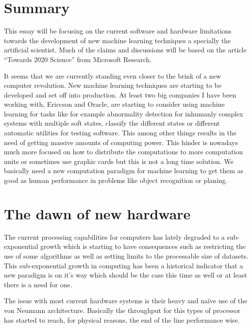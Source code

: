 \documentclass{article}
\begin{document}

\section{Summary}
    This essay will be focusing on the current software and hardware limitations
    towards the development of new machine learning techniques a specially the
    artificial scientist. Much of the claims and discussions will be based on
    the article ``Towards 2020 Science'' from Microsoft Research.\cite{ms2020}

    It seems that we are currently standing even closer to the brink of a new 
    computer revolution. New machine learning techniques are starting to be 
    developed and set off into production. At least two big companies I have been working
    with, Ericcson and Oracle, are starting to consider using machine learning
    for tasks like for example abnormality detection for inhumanly complex
    systems with multiple soft
    states, classify the different states or different automatic utilities for
    testing software. This among other things results in
    the need of getting massive amounts of computing power.
    This hinder is nowadays much more focused on how to 
    distribute the computations to more computation units or sometimes use
    graphic cards but this is not a long time solution. We basically need a new
    computation paradigm for machine learning to get them as good as human
    performance in problems like object recognition or planing.



\section{The dawn of new hardware}
    The current processing capabilities for computers has lately degraded to a
    sub-exponential growth which is starting to have consequences such as 
    restricting the use of some algorithms as well as setting limits 
    to the processable size of datasets.
    This sub-exponential growth in computing has been a historical indicator
    that a new paradigm is on it's way which should be the case this time as
    well or at least there is a need for one.%
    
    The issue with most current hardware systems is their heavy and na\"{i}ve use of the von
    Neumann architecture. Basically the throughput for this types of processor
    has started to reach, for physical reasons, the end of the line 
    performance wise.
\end{document}
